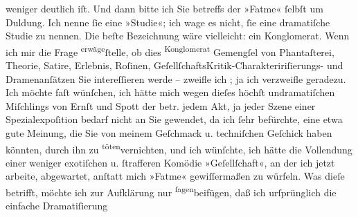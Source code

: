 \begin{ledgroupsized}[t]{13cm}
{                  weniger deutlich iſt.}\pend
           \pstart
           Und dann bitte ich Sie \introOben{}betreffs\introOben{} der »Fatme« ſelbſt  um Duldung.
               Ich nenne ſie eine »Studie«; ich wage es nicht, ſie eine dramatiſche Studie zu
               nennen. Die beſte Bezeichnung wäre vielleicht: ein Konglomerat. Wenn ich \introOben{}mir\introOben{} die Frage \substVorne{}\textsuperscript{erwäge}{\allowbreak}\substDazwischen{}ſtelle\substHinten{}, ob dies \substVorne{}\textsuperscript{Konglomerat}{\allowbreak}\substDazwischen{} Gemengſel\substHinten{} von  Phantaſterei, \introOben{}Theorie, \introOben{}{ }Satire, \introOben{}Erlebnis\introOben{}, Roſinen,
                  \introOben{}Geſellſchafts\introOben{}Kritik-\introOben{}Charakteririſierungs-\introOben{} und Dramenanſätzen Sie intereſſieren werde –  zweifle ich ; ja ich verzweifle geradezu. Ich möchte
               faſt wünſchen, ich hätte mich \introOben{}wegen\introOben{} dieſes \introOben{}höchſt undramatiſchen\introOben{} Miſchlings von Ernſt und Spott \introOben{}der betr.  jedem Akt, ja jeder Szene  einer
                  Spezialexpoſition  bedarf\introOben{}{ } nicht an Sie gewendet, da ich ſehr befürchte,
               eine etwa gute Meinung, die Sie von meinem Geſchmack \introOben{}u.
                  techniſchen Geſchick\introOben{} haben könnten, durch
                  \introOben{}ihn\introOben{} zu \substVorne{}\textsuperscript{töten}\substDazwischen{}vernichten\substHinten{}, und ich wünſchte, ich hätte die Vollendung einer \introOben{}weniger
                  exotiſchen u. ſtrafferen\introOben{} Komödie »Geſellſchaft«, an der ich jetzt arbeite, abgewartet, anſtatt mich »Fatme« \introOben{}gewiſſermaßen\introOben{} zu
               würfeln.\pend
           \pstart
           Was dieſe betrifft, möchte ich zur Aufklärung nur \substVorne{}\textsuperscript{ſagen}\substDazwischen{}beifügen\substHinten{}, daß ich urſprünglich die \introOben{}einfache\introOben{} Dramatiſierung

\end{ledgroupsized}
